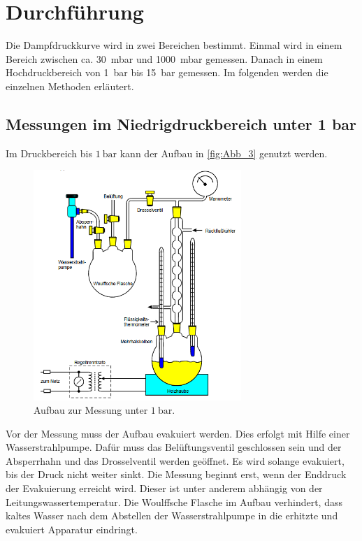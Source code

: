\section{Durchführung}
\label{sec:Durchführung}

Die Dampfdruckkurve wird in zwei Bereichen bestimmt.
Einmal wird in einem Bereich zwischen ca. \qty{30}{\milli\bar} und \qty{1000}{\milli\bar} gemessen.
Danach in einem Hochdruckbereich von \qty{1}{\bar} bis \qty{15}{\bar} gemessen.
Im folgenden werden die einzelnen Methoden erläutert.

\subsection{Messungen im Niedrigdruckbereich unter 1 bar} %
\label{sub:M_Niedrigdruckbereich}
Im Druckbereich bis $\qty{1}{\bar}$ kann der Aufbau in \autoref{fig:Abb_3} genutzt werden.
\begin{figure}[H]
    \centering
    \includegraphics[width=0.7\textwidth]{build/Abb_3.PNG}
    \caption {Aufbau zur Messung unter $\qty{1}{\bar}$.\cite{V203}}
    \label{fig:Abb_3}
\end{figure}
Vor der Messung muss der Aufbau evakuiert werden.
Dies erfolgt mit Hilfe einer Wasserstrahlpumpe. Dafür muss das Belüftungsventil geschlossen sein und der Absperrhahn und das Drosselventil werden geöffnet.
Es wird solange evakuiert, bis der Druck nicht weiter sinkt. 
Die Messung beginnt erst, wenn der Enddruck der Evakuierung erreicht wird.
Dieser ist unter anderem abhängig von der Leitungswassertemperatur.
Die Woulffsche Flasche im Aufbau verhindert, dass kaltes Wasser nach dem Abstellen der Wasserstrahlpumpe in die erhitzte und evakuiert Apparatur eindringt.
